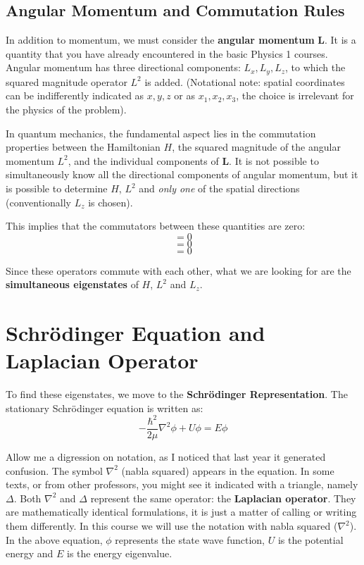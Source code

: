 \subsection{Angular Momentum and Commutation Rules}

In addition to momentum, we must consider the \textbf{angular momentum} $\mathbf{L}$. It is a quantity that you have already encountered in the basic Physics 1 courses.
Angular momentum has three directional components: $L_x, L_y, L_z$, to which the squared magnitude operator $L^2$ is added. (Notational note: spatial coordinates can be indifferently indicated as $x, y, z$ or as $x_1, x_2, x_3$, the choice is irrelevant for the physics of the problem).

In quantum mechanics, the fundamental aspect lies in the commutation properties between the Hamiltonian $H$, the squared magnitude of the angular momentum $L^2$, and the individual components of $\mathbf{L}$.
It is not possible to simultaneously know all the directional components of angular momentum, but it is possible to determine $H$, $L^2$ and \textit{only one} of the spatial directions (conventionally $L_z$ is chosen).

This implies that the commutators between these quantities are zero:
\begin{equation}
[H, L^2] = 0
\end{equation}
\begin{equation}
[H, L_z] = 0
\end{equation}
\begin{equation}
[L^2, L_z] = 0
\end{equation}

Since these operators commute with each other, what we are looking for are the \textbf{simultaneous eigenstates} of $H$, $L^2$ and $L_z$.

\section{Schrödinger Equation and Laplacian Operator}

To find these eigenstates, we move to the \textbf{Schrödinger Representation}. The stationary Schrödinger equation is written as:
\begin{equation}
-\frac{\hbar^2}{2\mu} \nabla^2 \phi + U \phi = E \phi
\end{equation}

Allow me a digression on notation, as I noticed that last year it generated confusion. The symbol $\nabla^2$ (nabla squared) appears in the equation. In some texts, or from other professors, you might see it indicated with a triangle, namely $\Delta$.
Both $\nabla^2$ and $\Delta$ represent the same operator: the \textbf{Laplacian operator}. They are mathematically identical formulations, it is just a matter of calling or writing them differently. In this course we will use the notation with nabla squared ($\nabla^2$). In the above equation, $\phi$ represents the state wave function, $U$ is the potential energy and $E$ is the energy eigenvalue.

